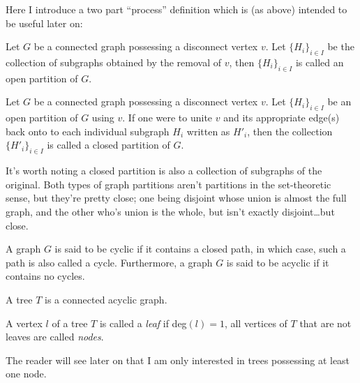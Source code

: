 \documentclass[twoside]{book}
\newenvironment{definition}[1][Definition]{\begin{trivlist}
\item[\hskip \labelsep {\bfseries Definition (#1):}]}{\end{trivlist}}
\begin{document}
Here I introduce a two part ``process'' definition which is (as above) intended to be useful later on:

\begin{definition}[Open Partition]

Let $ G $ be a connected graph possessing a disconnect vertex $ v $.  Let $ \{H_i\}_{i\in I} $ be the collection
of subgraphs obtained by the removal of $ v $, then $ \{H_i\}_{i\in I} $ is called an open partition of $ G $.

\end{definition}

\begin{definition}[Closed Partition]

Let $ G $ be a connected graph possessing a disconnect vertex $ v $.  Let $ \{H_i\}_{i\in I} $ be an open partition
of $ G $ using $ v $.  If one were to unite $ v $ and its appropriate edge(s) back onto to each individual subgraph
$ H_i $ written as $ H'_i $, then the collection $ \{H'_i\}_{i\in I} $ is called a closed partition of $ G $.

\end{definition}

It's worth noting a closed partition is also a collection of subgraphs of the original.  Both types of graph
partitions aren't partitions in the set-theoretic sense, but they're pretty close; one being disjoint whose union
is almost the full graph, and the other who's union is the whole, but isn't exactly disjoint\ldots but close.

\begin{definition}[Cyclic Graph]

A graph $ G $ is said to be cyclic if it contains a closed path, in which case, such a path is also called a cycle.
Furthermore, a graph $ G $ is said to be acyclic if it contains no cycles.

\end{definition}

\begin{definition}[Tree]

A tree $ T $ is a connected acyclic graph.

\end{definition}
A vertex $ l $ of a tree $ T $ is called a \emph{leaf} if deg$ (l)=1 $,
all vertices of $ T $ that are not leaves are called \emph{nodes}.

The reader will see later on that I am only interested in trees possessing at least one node.
\end{document}
